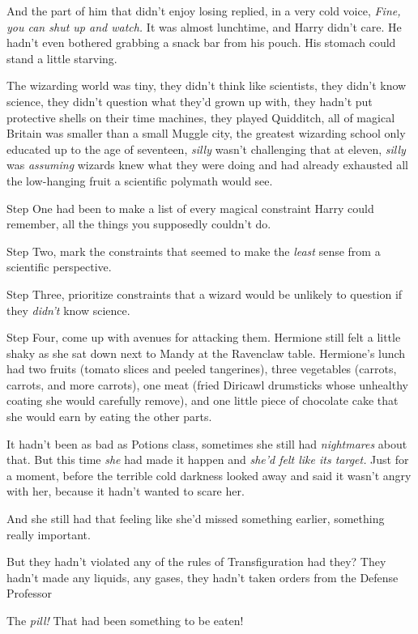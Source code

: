 And the part of him that didn't enjoy losing replied, in a very cold voice,
\emph{Fine, you can shut up and watch.}
\sbreak
It was almost lunchtime, and Harry didn't care. He hadn't even bothered
grabbing a snack bar from his pouch. His stomach could stand a little starving.

The wizarding world was tiny, they didn't think like scientists, they didn't
know science, they didn't question what they'd grown up with, they hadn't put
protective shells on their time machines, they played Quidditch, all of magical
Britain was smaller than a small Muggle city, the greatest wizarding school
only educated up to the age of seventeen, \emph{silly} wasn't challenging that
at eleven, \emph{silly} was \emph{assuming} wizards knew what they were doing
and had already exhausted all the low-hanging fruit a scientific polymath would
see.

Step One had been to make a list of every magical constraint Harry could
remember, all the things you supposedly couldn't do.

Step Two, mark the constraints that seemed to make the \emph{least} sense from
a scientific perspective.

Step Three, prioritize constraints that a wizard would be unlikely to question
if they \emph{didn't} know science.

Step Four, come up with avenues for attacking them.
\sbreak
Hermione still felt a little shaky as she sat down next to Mandy at the
Ravenclaw table. Hermione's lunch had two fruits (tomato slices and peeled
tangerines), three vegetables (carrots, carrots, and more carrots), one meat
(fried Diricawl drumsticks whose unhealthy coating she would carefully remove),
and one little piece of chocolate cake that she would earn by eating the other
parts.

It hadn't been as bad as Potions class, sometimes she still had
\emph{nightmares} about that. But this time \emph{she} had made it happen and
\emph{she'd felt like its target.} Just for a moment, before the terrible cold
darkness looked away and said it wasn't angry with her, because it hadn't
wanted to scare her.

And she still had that feeling like she'd missed something earlier, something
really important.

But they hadn't violated any of the rules of Transfiguration{\el} had they?
They hadn't made any liquids, any gases, they hadn't taken orders from the
Defense Professor{\el}

The \emph{pill!} That had been something to be eaten!

